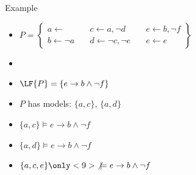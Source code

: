 \begin{frame}{Example}
  \bigskip
  \begin{itemize}
  \item<1->
    \(
    P
    =
    \left\{
      \begin{array}{lll}
        a \leftarrow                 \quad &
        c \leftarrow a, \neg d       \quad &
        e \leftarrow b, \neg f
        \\
        b \leftarrow \neg a         \quad &
        d \leftarrow \neg c, \neg e \quad &
        e \leftarrow e
      \end{array}
    \right\}
    \)
    \bigskip
  \item<1-> []
    \begin{center}
      
    \end{center}
  \item<1-> $\LF{P}=\{e\rightarrow b\wedge\neg f\}$
  \item<2-> $P$ has  models:
    \alert<4-5>{$\{a,c\}$}, \alert<6-7>{$\{a,d\}$}
    \smallskip
  \item<only@4-5> $\{a,c\}                \models e\rightarrow b\wedge\neg f$ \ 
  \item<only@6-7> $\{a,d\}                \models e\rightarrow b\wedge\neg f$ \ 
  \item<only@8->  $\{a,c,e\}\only<9>{\not}\models e\rightarrow b\wedge\neg f$ \ 
  \end{itemize}
\end{frame}
